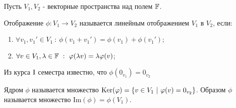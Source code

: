     Пусть $V_1, V_2$ - векторные пространства над полем $\F$.
    \begin{definition}
        Отображение $\phi: V_1 \rightarrow V_2$ называется линейным отображением $V_1$ в $V_2$, если:
        \begin{enumerate}
            \item $\forall v_1, v_1'\in V_1 \ : \ \phi(v_1 + v_1') = \phi(v_1) + \phi(v_1')$;
            \item $\forall v \in V_1, \lambda \in \F \ : \ \phi(\lambda v) = \lambda\phi(v)$;
        \end{enumerate}
    \end{definition}
        Из курса $\textup{I}$ семестра известно, что $\phi (0_{v_1}) = 0_{v_2}$
    \begin{definition}
        Ядром $\phi$ называется множество $\textup{Ker}(\phi) = \{v \in V_1 \ | \ \phi(v) = 0_{v_2}\}$. Образом $\phi$ называется множество $\text{Im}(\phi) = \phi(V_1)$.
    \end{definition}

